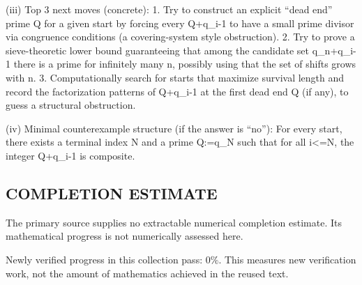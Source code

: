 (iii) Top 3 next moves (concrete):
1. Try to construct an explicit “dead end” prime Q for a given start by forcing every Q+q_i-1 to have a small prime divisor via congruence conditions (a covering-system style obstruction).
2. Try to prove a sieve-theoretic lower bound guaranteeing that among the candidate set {q_n+q_i-1} there is a prime for infinitely many n, possibly using that the set of shifts grows with n.
3. Computationally search for starts that maximize survival length and record the factorization patterns of Q+q_i-1 at the first dead end Q (if any), to guess a structural obstruction.

(iv) Minimal counterexample structure (if the answer is “no”):
For every start, there exists a terminal index N and a prime Q:=q_N such that for all i<=N, the integer Q+q_i-1 is composite.




\subsection*{COMPLETION ESTIMATE}
The primary source supplies no extractable numerical completion estimate. Its mathematical progress is not numerically assessed here.

Newly verified progress in this collection pass: $0\%$. This measures new verification work, not the amount of mathematics achieved in the reused text.
